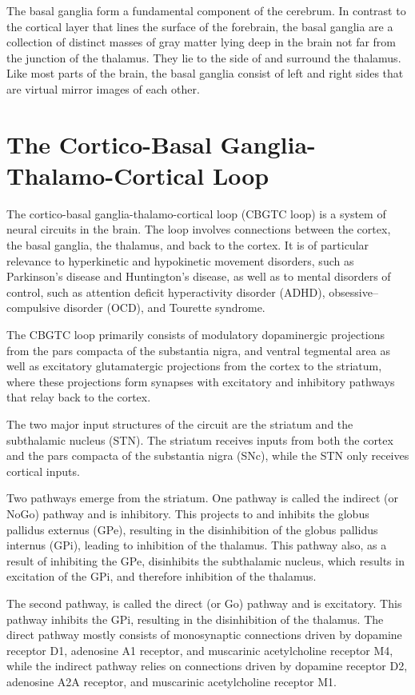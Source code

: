 The basal ganglia form a fundamental component of the cerebrum. In contrast to the cortical layer that lines the surface of the forebrain, the basal ganglia are a collection of distinct masses of gray matter lying deep in the brain not far from the junction of the thalamus. They lie to the side of and surround the thalamus. Like most parts of the brain, the basal ganglia consist of left and right sides that are virtual mirror images of each other.

\hypertarget{the-cortico-basal-ganglia-thalamo-cortical-loop}{%
\section{The Cortico-Basal Ganglia-Thalamo-Cortical Loop}\label{the-cortico-basal-ganglia-thalamo-cortical-loop}}

The cortico-basal ganglia-thalamo-cortical loop (CBGTC loop) is a system of neural circuits in the brain. The loop involves connections between the cortex, the basal ganglia, the thalamus, and back to the cortex. It is of particular relevance to hyperkinetic and hypokinetic movement disorders, such as Parkinson's disease and Huntington's disease, as well as to mental disorders of control, such as attention deficit hyperactivity disorder (ADHD), obsessive--compulsive disorder (OCD), and Tourette syndrome.

The CBGTC loop primarily consists of modulatory dopaminergic projections from the pars compacta of the substantia nigra, and ventral tegmental area as well as excitatory glutamatergic projections from the cortex to the striatum, where these projections form synapses with excitatory and inhibitory pathways that relay back to the cortex.

The two major input structures of the circuit are the striatum and the subthalamic nucleus (STN). The striatum receives inputs from both the cortex and the pars compacta of the substantia nigra (SNc), while the STN only receives cortical inputs.

Two pathways emerge from the striatum. One pathway is called the indirect (or NoGo) pathway and is inhibitory. This projects to and inhibits the globus pallidus externus (GPe), resulting in the disinhibition of the globus pallidus internus (GPi), leading to inhibition of the thalamus. This pathway also, as a result of inhibiting the GPe, disinhibits the subthalamic nucleus, which results in excitation of the GPi, and therefore inhibition of the thalamus.

The second pathway, is called the direct (or Go) pathway and is excitatory. This pathway inhibits the GPi, resulting in the disinhibition of the thalamus. The direct pathway mostly consists of monosynaptic connections driven by dopamine receptor D1, adenosine A1 receptor, and muscarinic acetylcholine receptor M4, while the indirect pathway relies on connections driven by dopamine receptor D2, adenosine A2A receptor, and muscarinic acetylcholine receptor M1.



